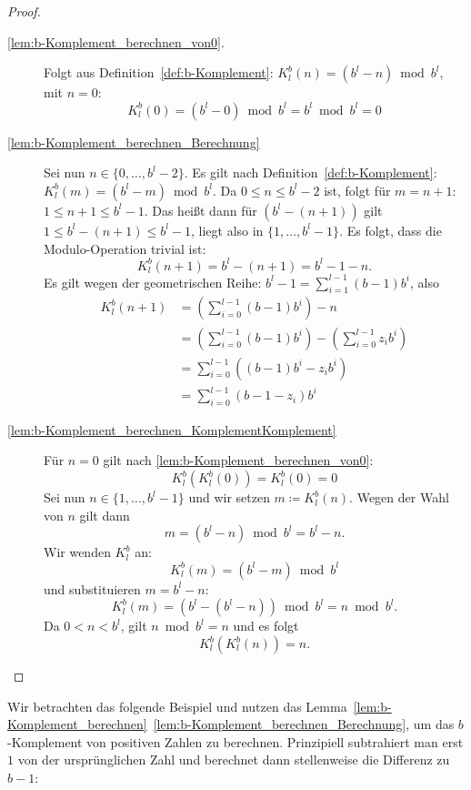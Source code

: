 \documentclass{article}
\begin{document}
    \begin{proof}
      \begin{description}
        \item[\ref{lem:b-Komplement_berechnen_von0}.] Folgt aus Definition~\ref{def:b-Komplement}: $K_l^b(n) = (b^l-n) \bmod b^l$, mit $n=0$:
          \[K_l^b(0)=(b^l-0) \bmod b^l = b^l \bmod b^l = 0\]
        \item[\ref{lem:b-Komplement_berechnen_Berechnung}] Sei nun $n \in \{0,\dots,b^l-2\}$.
          Es gilt nach Definition~\ref{def:b-Komplement}: $K^b_l(m)=(b^l-m) \bmod b^l$.
          Da $0 \leq n \leq b^l -2$ ist, folgt für $m = n+1$:
          $1 \leq n+1 \leq b^l-1$.
          Das heißt dann für $(b^l - (n+1))$ gilt $1 \leq b^l-(n+1) \leq b^l -1$, liegt also in $\{1, \dots, b^l-1\}$.
          Es folgt, dass die Modulo-Operation trivial ist:
          \[K^b_l(n+1)=b^l-(n+1)=b^l-1-n.\]
          Es gilt wegen der geometrischen Reihe: $b^l-1 = \displaystyle\sum_{i=1}^{l-1} (b-1)b^i$, also
          \begin{align*}
            K^b_l(n+1) &= \left(\sum_{i=0}^{l-1}(b-1)b^i\right) -n \\
            &= \left(\sum_{i=0}^{l-1}(b-1)b^i\right) - \left(\sum_{i=0}^{l-1} z_ib^i\right) \\
            &= \sum_{i=0}^{l-1} ((b-1)b^i - z_ib^i) \\
            &= \sum_{i=0}^{l-1} (b-1-z_i) b^i
          \end{align*}
        \item[\ref{lem:b-Komplement_berechnen_KomplementKomplement}] Für $n=0$ gilt nach \ref{lem:b-Komplement_berechnen_von0}: 
          \[K^b_l(K^b_l(0)) = K^b_l(0) = 0\]
          Sei nun $n \in \{1, \dots, b^l-1\}$ und wir setzen $m \coloneq K_l^b(n)$.
          Wegen der Wahl von $n$ gilt dann 
          \[m = (b^l-n) \bmod b^l = b^l-n.\]
          Wir wenden $K_l^b$ an:
          \[K_l^b(m) = (b^l-m) \bmod b^l\]
          und substituieren $m=b^l-n$:
          \[K_l^b(m)=(b^l-(b^l-n)) \bmod b^l = n \bmod b^l.\]
          Da $0 < n < b^l$, gilt $n \bmod b^l = n$ und es folgt
          \[K^b_l(K^b_l(n))=n.\]
      \end{description}
    \end{proof}

  Wir betrachten das folgende Beispiel und nutzen das Lemma~\ref{lem:b-Komplement_berechnen}~\ref{lem:b-Komplement_berechnen_Berechnung}, um das $b$-Komplement von positiven Zahlen zu berechnen.
  Prinzipiell subtrahiert man erst $1$ von der ursprünglichen Zahl und berechnet dann stellenweise die Differenz zu $b-1$:
\end{document}
